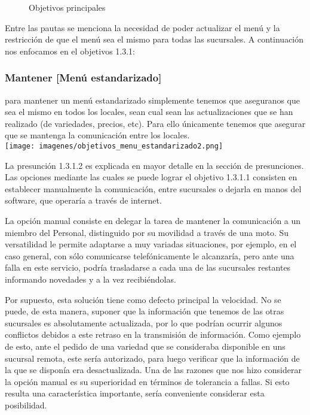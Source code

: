 \documentclass[a4paper,10pt]{article}
\begin{document}
\begin{figure}[H]
\centering
{}
\caption{Objetivos principales}
\end{figure}

Entre las pautas se menciona la necesidad de poder actualizar el menú y la restricción de que el menú sea el mismo para todas las sucursales. A continuación nos enfocamos en el objetivos 1.3.1:
\subsubsection*{Mantener [Menú estandarizado]}
para mantener un menú estandarizado simplemente tenemos que aseguranos que sea el mismo en todos los locales, sean cual sean las actualizaciones que se han realizado (de variedades, precios, etc). Para ello únicamente tenemos que asegurar que se mantenga la comunicación entre los locales. \\
\texttt{[image: imagenes/objetivos\_menu\_estandarizado2.png]}


La presunción 1.3.1.2 es explicada en mayor detalle en la sección de presunciones.
Las opciones mediante las cuales se puede lograr el objetivo 1.3.1.1 consisten en establecer manualmente la comunicación, entre sucursales o dejarla en manos del software, que operaría a través de internet. 

La opción manual consiste en delegar la tarea de mantener la comunicación a un miembro del Personal, distinguido por su movilidad a través de una moto. Su versatilidad le permite adaptarse a muy variadas situaciones, por ejemplo, en el caso general, con sólo comunicarse telefónicamente le alcanzaría, pero ante una falla en este servicio, podría trasladarse a cada una de las sucursales restantes informando novedades y a la vez recibiéndolas. 

Por supuesto, esta solución tiene como defecto principal la velocidad. No se puede, de esta manera, suponer que la información que tenemos de las otras sucursales es absolutamente actualizada, por lo que podrían ocurrir algunos conflictos debidos a este retraso en la transmisión de información. Como ejemplo de esto, ante el pedido de una variedad que se consideraba disponible en uns sucursal remota, este sería autorizado, para luego verificar que la información de la que se disponía era desactualizada. 
Una de las razones que nos hizo considerar la opción manual es su superioridad en términos de tolerancia a fallas. Si esto resulta una característica importante, sería conveniente considerar esta posibilidad.
\end{document}
